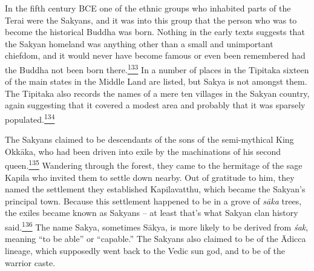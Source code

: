 In the fifth century BCE one of the ethnic groups who inhabited parts of
the Terai were the Sakyans, and it was into this group that the person
who was to become the historical Buddha was born. Nothing in the early
texts suggests that the Sakyan homeland was anything other than a small
and unimportant chiefdom, and it would never have become famous or even
been remembered had the Buddha not been born
there.\label{footprints_split_008.html_fnref133}\hyperref[footprints_split_024.htmlux5cux23fn133]{\textsuperscript{133}}
In a number of places in the Tipitaka sixteen of the main states in the
Middle Land are listed, but Sakya is not amongst them. The Tipitaka also
records the names of a mere ten villages in the Sakyan country, again
suggesting that it covered a modest area and probably that it was
sparsely
populated.\label{footprints_split_008.html_fnref134}\hyperref[footprints_split_024.htmlux5cux23fn134]{\textsuperscript{134}}

The Sakyans claimed to be descendants of the sons of the semi-mythical
King Okkāka, who had been driven into exile by the machinations of his
second
queen.\label{footprints_split_008.html_fnref135}\hyperref[footprints_split_024.htmlux5cux23fn135]{\textsuperscript{135}}
Wandering through the forest, they came to the hermitage of the sage
Kapila who invited them to settle down nearby. Out of gratitude to him,
they named the settlement they established Kapilavatthu, which became
the Sakyan's principal town. Because this settlement happened to be in a
grove of \emph{sāka} trees, the exiles became known as Sakyans -- at
least that's what Sakyan clan history
said.\label{footprints_split_008.html_fnref136}\hyperref[footprints_split_024.htmlux5cux23fn136]{\textsuperscript{136}}
The name Sakya, sometimes Sākya, is more likely to be derived from
\emph{śak}, meaning ``to be able'' or ``capable.'' The Sakyans also
claimed to be of the Ādicca lineage, which supposedly went back to the
Vedic sun god, and to be of the warrior caste.

